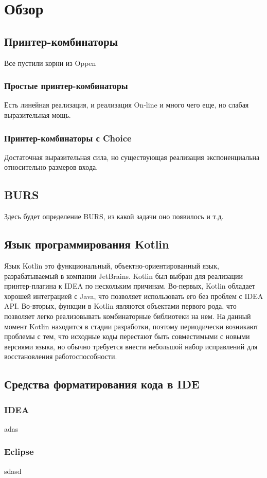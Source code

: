 \section{Обзор}

\subsection{Принтер-комбинаторы}
Все пустили корни из Oppen

\subsubsection{Простые принтер-комбинаторы}
Есть линейная реализация, и реализация On-line и много чего еще, но слабая выразительная мощь.

\subsubsection{Принтер-комбинаторы с Choice}
Достаточная выразительная сила, но существующая реализация экспоненциальна
относительно размеров входа.

\subsection{BURS}
Здесь будет определение BURS, из какой задачи оно появилось и т.д.

\subsection{Язык программирования Kotlin}

Язык Kotlin это функциональный, объектно-ориентированный язык,
разрабатываемый в компании JetBrains.
Kotlin был выбран для реализации принтер-плагина к IDEA по нескольким причинам. 
Во-первых, Kotlin обладает хорошей интеграцией с Java, что позволяет
использовать его без проблем с IDEA API. 
Во-вторых, функции в Kotlin являются объектами первого рода, что позволяет
легко реализовывать комбинаторные библиотеки на нем.
На данный момент Kotlin находится в стадии разработки, поэтому
периодически возникают
проблемы с тем, что исходные коды перестают быть совместимыми с новыми
версиями языка,
но обычно требуется внести небольшой набор исправлений для
восстановления работоспособности.

\subsection{Средства форматирования кода в IDE}

\subsubsection{IDEA}
adas
\subsubsection{Eclipse}
sdasd
